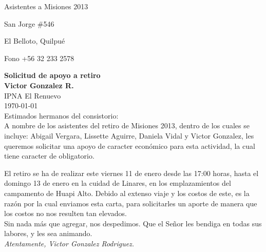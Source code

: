 \documentclass[12pt,letterpaper]{article}
\begin{document}
\hfill Asistentes a Misiones 2013

\hfill San Jorge \#546

\hfill El Belloto, Quilpué

\hfill Fono +56 32 233 2578

\hfill \textbf{Solicitud de apoyo a retiro}
\\
\textbf{Victor Gonzalez R.} \\ IPNA El Renuevo \\  \today \\

Estimados hermanos del consistorio:\\

A nombre de los asistentes del retiro de Misiones 2013, dentro de los cuales se incluye: Abigail Vergara, Lissette Aguirre, Daniela Vidal y Victor Gonzalez, les queremos solicitar una apoyo de caracter económico para esta actividad, la cual tiene caracter de obligatorio.

El retiro se ha de realizar este viernes 11 de enero desde las 17:00 horas, hasta el domingo 13 de enero en la cuidad de Linares, en los emplazamientos del campamento de Huapi Alto. Debido al extenso viaje y los costos de este, es la razón por la cual enviamos esta carta, para solicitarles un aporte de manera que los costos no nos resulten tan elevados.\\

Sin nada más que agregar, nos despedimos. Que el Señor les bendiga en todas sus labores, y les sea animando.\\

\textit{Atentamente, Victor Gonzalez Rodriguez.}
\end{document}

